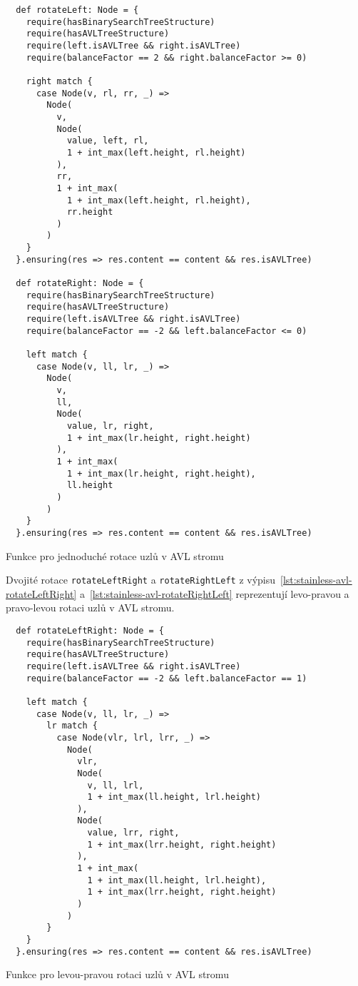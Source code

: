 \begin{listing}[H]
  \begin{verbatim}
  def rotateLeft: Node = {
    require(hasBinarySearchTreeStructure)
    require(hasAVLTreeStructure)
    require(left.isAVLTree && right.isAVLTree)
    require(balanceFactor == 2 && right.balanceFactor >= 0)

    right match {
      case Node(v, rl, rr, _) =>
        Node(
          v,
          Node(
            value, left, rl,
            1 + int_max(left.height, rl.height)
          ),
          rr,
          1 + int_max(
            1 + int_max(left.height, rl.height),
            rr.height
          )
        )
    }
  }.ensuring(res => res.content == content && res.isAVLTree)

  def rotateRight: Node = {
    require(hasBinarySearchTreeStructure)
    require(hasAVLTreeStructure)
    require(left.isAVLTree && right.isAVLTree)
    require(balanceFactor == -2 && left.balanceFactor <= 0)

    left match {
      case Node(v, ll, lr, _) =>
        Node(
          v,
          ll,
          Node(
            value, lr, right,
            1 + int_max(lr.height, right.height)
          ),
          1 + int_max(
            1 + int_max(lr.height, right.height),
            ll.height
          )
        )
    }
  }.ensuring(res => res.content == content && res.isAVLTree)
  \end{verbatim}
  \caption{Funkce pro jednoduché rotace uzlů v AVL stromu}
  \label{lst:stainless-avl-rotate}
\end{listing}

Dvojité rotace \texttt{rotateLeftRight} a \texttt{rotateRightLeft}
z výpisu~\ref{lst:stainless-avl-rotateLeftRight} a~\ref{lst:stainless-avl-rotateRightLeft}
reprezentují levo-pravou a pravo-levou rotaci uzlů v AVL stromu.

\begin{listing}[H]
  \begin{verbatim}
  def rotateLeftRight: Node = {
    require(hasBinarySearchTreeStructure)
    require(hasAVLTreeStructure)
    require(left.isAVLTree && right.isAVLTree)
    require(balanceFactor == -2 && left.balanceFactor == 1)

    left match {
      case Node(v, ll, lr, _) =>
        lr match {
          case Node(vlr, lrl, lrr, _) =>
            Node(
              vlr,
              Node(
                v, ll, lrl,
                1 + int_max(ll.height, lrl.height)
              ),
              Node(
                value, lrr, right,
                1 + int_max(lrr.height, right.height)
              ),
              1 + int_max(
                1 + int_max(ll.height, lrl.height),
                1 + int_max(lrr.height, right.height)
              )
            )
        }
    }
  }.ensuring(res => res.content == content && res.isAVLTree)
  \end{verbatim}
  \caption{Funkce pro levou-pravou rotaci uzlů v AVL stromu}
  \label{lst:stainless-avl-rotateLeftRight}
\end{listing}

